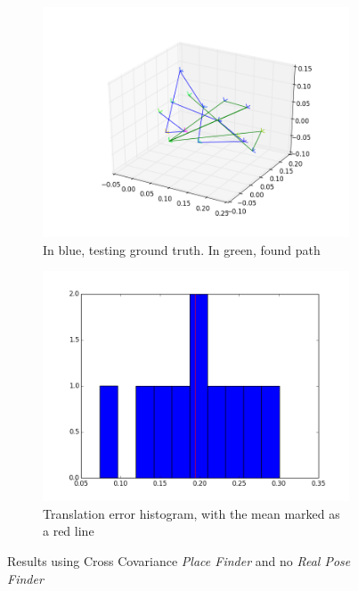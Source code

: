 \begin{figure}[htpb]
  \begin{subfigure}[b]{6cm}
          \includegraphics[width=\linewidth]{img/desktop_2_CC_empty_path_1.png}
          \caption{In blue, testing ground truth. In green, found path}                
          \label{fig:desktop_2_CC_empty_path_1}
  \end{subfigure}   
  \qquad
  \begin{subfigure}[b]{6cm}
         \includegraphics[width=\linewidth]{img/desktop_2_CC_empty_dist_1.png}
         \caption{Translation error histogram, with the mean marked as a red line}                
         \label{fig:desktop_2_CC_empty_dist_1}
  \end{subfigure}
  \caption{Results using Cross Covariance \textit{Place Finder} and no \textit{Real Pose Finder}}
\end{figure}

